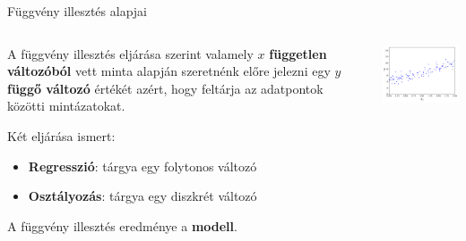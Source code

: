 \documentclass[english, aspectratio=169]{beamer}
\begin{document}
\begin{frame}{Függvény illesztés alapjai}
\begin{columns}
\begin{column}{.5\textwidth}
A függvény illesztés eljárása szerint valamely $x$ \textbf{független változóból} vett minta alapján szeretnénk előre jelezni egy $y$ \textbf{függő változó} értékét azért, hogy feltárja az adatpontok közötti mintázatokat.\par\smallskip
Két eljárása ismert:
\begin{itemize}
	\item \textbf{Regresszió}: tárgya egy folytonos változó
	\item \textbf{Osztályozás}: tárgya egy diszkrét változó
\end{itemize}
A függvény illesztés eredménye a \textbf{modell}.
\end{column}
\begin{column}{.5\textwidth}
\begin{center}
\includegraphics[width=7cm, keepaspectratio]{images/ql_8.png}
\end{center}
\end{column}
\end{columns}
\end{frame}
\end{document}
